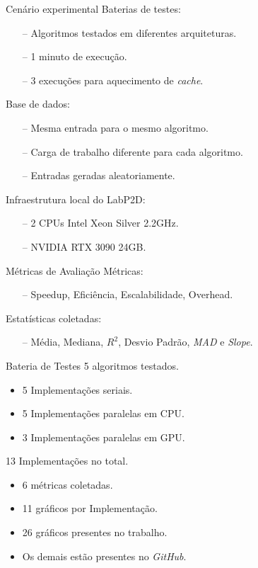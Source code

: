 \begin{frame}{Cenário experimental}
    Baterias de testes:
    \begin{itemize}
        \item[--] Algoritmos testados em diferentes arquiteturas.
        \item[--] 1 minuto de execução.
        \item[--] 3 execuções para aquecimento de \textit{cache}.
    \end{itemize} 
    \vspace{1em}
    Base de dados:
    \begin{itemize}
        \item[--] Mesma entrada para o mesmo algoritmo.
        \item[--] Carga de trabalho diferente para cada algoritmo.
        \item[--] Entradas geradas aleatoriamente.
    \end{itemize}
    \vspace{1em}
    Infraestrutura local do LabP2D:
    \begin{itemize}
        \item[--] 2 CPUs Intel Xeon Silver 2.2GHz.
        \item[--] NVIDIA RTX 3090 24GB.
    \end{itemize}
\end{frame}

\begin{frame}{Métricas de Avaliação}
    Métricas:
    \begin{itemize}
        \item[--] Speedup, Eficiência, Escalabilidade, Overhead.
    \end{itemize}
    \vspace{1em}
    Estatísticas coletadas:
    \begin{itemize}
        \item[--] Média, Mediana, $R^2$, Desvio Padrão, \textit{MAD} e \textit{Slope}.
    \end{itemize}
\end{frame}

\begin{frame}{Bateria de Testes}
    5 algoritmos testados.
    \begin{itemize}
        \item 5 Implementações seriais.
        \item 5 Implementações paralelas em CPU.
        \item 3 Implementações paralelas em GPU.
    \end{itemize}
    13 Implementações no total.
    \vspace{1em}
    \begin{itemize}
        \item 6 métricas coletadas.
        \item 11 gráficos por Implementação.
        \item 26 gráficos presentes no trabalho.
        \item Os demais estão presentes no \textit{GitHub}.
    \end{itemize}
\end{frame}

